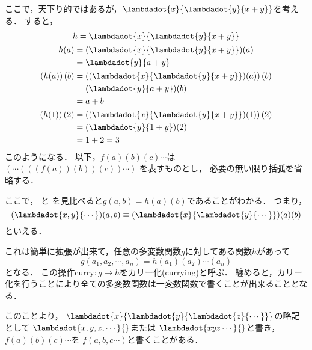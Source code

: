 \documentclass[a4paper,titlepage,report]{jsbook}
\begin{document}
ここで，天下り的ではあるが，$\lambdadot{x}{\lambdadot{y}{x+y}}$を考える．
すると，
\begin{gather}
\begin{aligned}
\label{eq:lambda-curried}
h &= \lambdadot{x}{\lambdadot{y}{x+y}} \\
\end{aligned} \\
\begin{aligned}
\label{eq:lambda-curried-partial}
h(a) &= (\lambdadot{x}{\lambdadot{y}{x+y}})(a)\\
     &= {\lambdadot{y}{a+y}}
\end{aligned} \\
\begin{aligned}
\label{eq:lambda-curried-inst}
\left(h(a)\right)(b) &= \left((\lambdadot{x}{\lambdadot{y}{x+y}})(a)\right)(b) \\
        &= (\lambdadot{y}{a+y})(b)\\
        &= a + b
\end{aligned} \\
\begin{aligned}
\left(h(1)\right)(2) &= \left((\lambdadot{x}{\lambdadot{y}{x+y}})(1)\right)(2) \\
        &= (\lambdadot{y}{1+y})(2) \\
        &= 1 + 2 = 3
\end{aligned}
\end{gather}
このようになる．
以下，$f(a)(b)(c)\cdots$は
$\left({\cdots\left({\left({\left({f(a)}\right)(b)}\right)(c)}\right)\cdots}\right)$
を表すものとし，
必要の無い限り括弧を省略する．

ここで，
と
を見比べると$g(a, b) = h(a)(b)$であることがわかる．
つまり，
\begin{equation}
(\lambdadot{x,y}{\cdots})(a,b) \equiv (\lambdadot{x}{\lambdadot{y}{\cdots}})(a)(b)
\end{equation}
といえる．

これは簡単に拡張が出来て，任意の多変数関数$g$に対してある関数$h$があって
\begin{equation}
g(a_1, a_2, \cdots, a_n)= h(a_1)(a_2)\cdots(a_n)
\end{equation}
となる．
この操作$\mathrm{curry}: g\mapsto h$をカリー化(currying)と呼ぶ．
纏めると，カリー化を行うことにより全ての多変数関数は一変数関数で書くことが出来ることとなる．

このことより，
$\lambdadot{x}{\lambdadot{y}{\lambdadot{z}{\cdots}}}$の略記として
$\lambdadot{x,y,z,\cdots}{}$または
$\lambdadot{xyz\cdots}{}$と書き，
$f(a)(b)(c)\cdots$を
$f(a,b,c\cdots)$と書くことがある．
\end{document}
